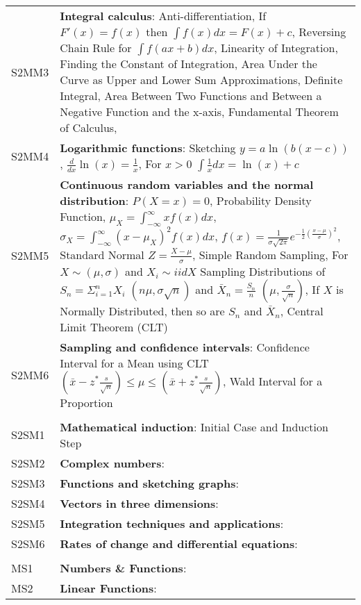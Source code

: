\documentclass[varwidth=144mm, 12pt]{standalone}
\begin{document}
\begin{longtable}{lp{}}
S2MM3 & \textbf{Integral calculus}: Anti-differentiation, If $F'(x) = f(x)$ then $\int{f(x)dx} = F(x) + c$, Reversing Chain Rule for $\int{f(ax + b)dx}$, Linearity of Integration, Finding the Constant of Integration, Area Under the Curve as Upper and Lower Sum Approximations, Definite Integral, Area Between Two Functions and Between a Negative Function and the x-axis, Fundamental Theorem of Calculus,  \\
S2MM4 & \textbf{Logarithmic functions}: Sketching $y = a\ln(b(x-c))$, $\frac{d}{dx}\ln(x) = \frac{1}{x}$, For $x > 0$ $\int{\frac{1}{x}dx} = \ln(x) + c$ \\
S2MM5 & \textbf{Continuous random variables and the normal distribution}: $P(X = x) = 0$, Probability Density Function, $\mu_X = \int_{-\infty}^{\infty}{xf(x)dx}$, $\sigma_X = \int_{-\infty}^{\infty}{(x - \mu_X)^2f(x)dx}$, $f(x) = \frac{1}{\sigma\sqrt{2\pi}}e^{-\frac{1}{2}\left( \frac{x-\mu}{\sigma}\right)^2}$, Standard Normal $Z = \frac{X - \mu}{\sigma}$, Simple Random Sampling, For $X \sim (\mu, \sigma)$ and $X_i \sim iid X$ Sampling Distributions of $S_n = \Sigma_{i = 1}^{n}{X_i}$ $(n\mu,\sigma\sqrt{n})$ and $\bar{X}_n = \frac{S_n}{n}$ $(\mu,\frac{\sigma}{\sqrt{n}})$, If $X$ is Normally Distributed, then so are $S_n$ and $\bar{X}_n$, Central Limit Theorem (CLT) \\
S2MM6 & \textbf{Sampling and confidence intervals}: Confidence Interval for a Mean using CLT $\left(\bar{x} - z^*\frac{s}{\sqrt{n}} \right) \leq \mu \leq \left( \bar{x} + z^*\frac{s}{\sqrt{n}}\right)$, Wald Interval for a Proportion  \\
& \\
S2SM1 & \textbf{Mathematical induction}: Initial Case and Induction Step \\
S2SM2 & \textbf{Complex numbers}: \\
S2SM3 & \textbf{Functions and sketching graphs}: \\
S2SM4 & \textbf{Vectors in three dimensions}: \\
S2SM5 & \textbf{Integration techniques and applications}: \\
S2SM6 & \textbf{Rates of change and differential equations}: \\
& \\
MS1 & \textbf{Numbers \& Functions}: \\
MS2 & \textbf{Linear Functions}: \\

\end{longtable}
\end{document}
